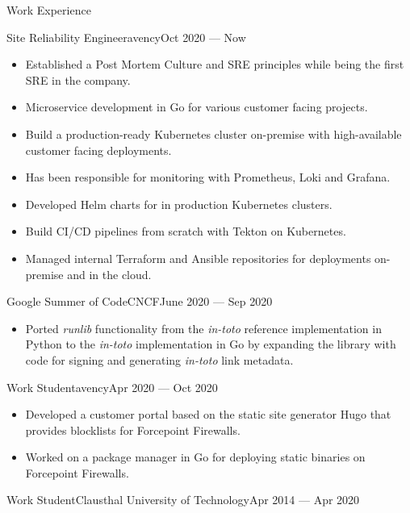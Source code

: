 \documentclass[]{mcdowellcv}
\begin{document}
\makeheader%

\begin{cvsection}{Work Experience}
\begin{cvsubsection}{Site Reliability Engineer}{avency}{Oct 2020 --- Now}
\begin{itemize}
\item Established a Post Mortem Culture and SRE principles while being the first SRE in the company.
\item Microservice development in Go for various customer facing projects.
\item Build a production-ready Kubernetes cluster on-premise with high-available customer facing deployments.
\item Has been responsible for monitoring with Prometheus, Loki and Grafana.
\item Developed Helm charts for in production Kubernetes clusters.
\item Build CI/CD pipelines from scratch with Tekton on Kubernetes.
\item Managed internal Terraform and Ansible repositories for deployments on-premise and in the cloud.
\end{itemize}
\end{cvsubsection}
\begin{cvsubsection}{Google Summer of Code}{CNCF}{June 2020 --- Sep 2020}
\begin{itemize}
\item Ported \textit{runlib} functionality from the \textit{in-toto} reference implementation in Python to the \textit{in-toto} implementation in Go by expanding the library with code for signing and generating \textit{in-toto} link metadata.
\end{itemize}
\end{cvsubsection}
\begin{cvsubsection}{Work Student}{avency}{Apr 2020 --- Oct 2020}
\begin{itemize}
\item Developed a customer portal based on the static site generator Hugo that provides blocklists for Forcepoint Firewalls.
\item Worked on a package manager in Go for deploying static binaries on Forcepoint Firewalls.
\end{itemize}
\end{cvsubsection}
\begin{cvsubsection}{Work Student}{Clausthal University of Technology}{Apr 2014 --- Apr 2020}
\bigskip
\begin{itemize}

\end{itemize}
\end{cvsubsection}
\end{cvsection}
\end{document}

